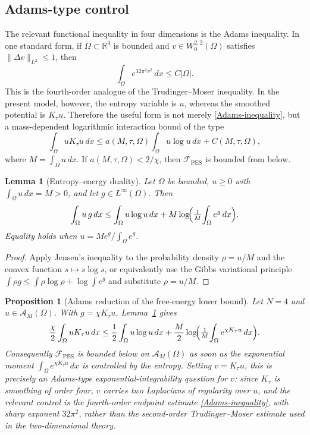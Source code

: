 \documentclass[pdflatex,sn-mathphys-num]{sn-jnl}%
\theoremstyle{thmstyleone}
\newtheorem{lemma}[theorem]{Lemma}
\newtheorem{proposition}[theorem]{Proposition}%
\theoremstyle{thmstyletwo}
\theoremstyle{thmstylethree}
\begin{document}
\subsection{Adams-type control}

The relevant functional inequality in four dimensions is the Adams inequality.
In one standard form, if \(\Omega\subset\mathbb R^4\) is bounded and
\(v\in W^{2,2}_0(\Omega)\) satisfies \(\|\Delta v\|_{L^2}\le1\), then
\begin{equation}
        \int_\Omega e^{32\pi^2 v^2}\,dx
        \le
        C|\Omega|.
\label{Adams-inequality}
\end{equation}
This is the fourth-order analogue of the Trudinger--Moser inequality.  In the
present model, however, the entropy variable is \(u\), whereas the smoothed
potential is \(K_\tau u\).  Therefore the useful form is not merely
\eqref{Adams-inequality}, but a mass-dependent logarithmic interaction bound
of the type
\begin{equation}
        \int_\Omega uK_\tau u\,dx
        \le
        a(M,\tau,\Omega)\int_\Omega u\log u\,dx
        +
        C(M,\tau,\Omega),
\label{abstract-log-bound}
\end{equation}
where \(M=\int_\Omega u\,dx\).  If \(a(M,\tau,\Omega)<2/\chi\), then
\(\mathcal F_{\mathrm{PES}}\) is bounded from below.

\begin{lemma}[Entropy--energy duality]
\label{lem:gibbs-duality}
Let \(\Omega\) be bounded, \(u\ge0\) with \(\int_\Omega u\,dx=M>0\), and let
\(g\in L^\infty(\Omega)\). Then
\[
   \int_\Omega u\,g\,dx
   \le
   \int_\Omega u\log u\,dx
   +M\log\!\Bigl(\tfrac1M\!\int_\Omega e^{g}\,dx\Bigr).
\]
Equality holds when \(u=M e^{g}/\!\int_\Omega e^{g}\).
\end{lemma}

\begin{proof}
Apply Jensen's inequality to the probability density \(\rho=u/M\) and the
convex function \(s\mapsto s\log s\), or equivalently use the Gibbs variational
principle \(\int\rho g\le\int\rho\log\rho+\log\int e^{g}\) and substitute
\(\rho=u/M\).
\end{proof}

\begin{proposition}[Adams reduction of the free-energy lower bound]
\label{prop:adams-reduction}
Let \(N=4\) and \(u\in\mathcal A_M(\Omega)\). With \(g=\chi K_\tau u\),
Lemma~\ref{lem:gibbs-duality} gives
\[
   \frac{\chi}{2}\int_\Omega uK_\tau u\,dx
   \le\frac12\int_\Omega u\log u\,dx
   +\frac{M}{2}\log\!\Bigl(\tfrac1M\!\int_\Omega e^{\chi K_\tau u}\,dx\Bigr).
\]
Consequently \(\mathcal F_{\mathrm{PES}}\) is bounded below on
\(\mathcal A_M(\Omega)\) as soon as the exponential moment
\(\int_\Omega e^{\chi K_\tau u}\,dx\) is controlled by the entropy. Setting
\(v=K_\tau u\), this is precisely an Adams-type exponential-integrability
question for \(v\): since \(K_\tau\) is smoothing of order four, \(v\) carries
two Laplacians of regularity over \(u\), and the relevant control is the
fourth-order endpoint estimate \eqref{Adams-inequality}, with sharp exponent
\(32\pi^2\), rather than the second-order Trudinger--Moser estimate used in the
two-dimensional theory.
\end{proposition}
\end{document}
